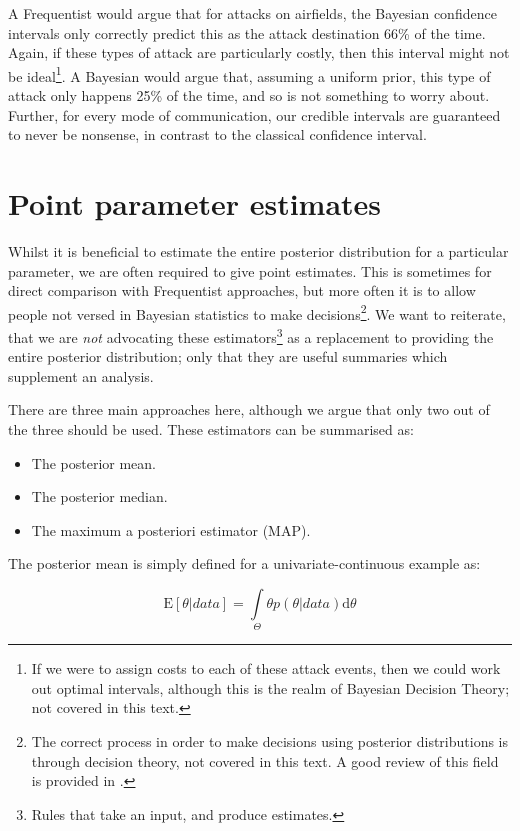 \documentclass[11pt,fullpage]{book}
\begin{document}
A Frequentist would argue that for attacks on airfields, the Bayesian confidence intervals only correctly predict this as the attack destination 66\% of the time. Again, if these types of attack are particularly costly, then this interval might not be ideal\footnote{If we were to assign costs to each of these attack events, then we could work out optimal intervals, although this is the realm of Bayesian Decision Theory; not covered in this text.}. A Bayesian would argue that, assuming a uniform prior, this type of attack only happens 25\% of the time, and so is not something to worry about. Further, for every mode of communication, our credible intervals are guaranteed to never be nonsense, in contrast to the classical confidence interval.

\section{Point parameter estimates}
Whilst it is beneficial to estimate the entire posterior distribution for a particular parameter, we are often required to give point estimates. This is sometimes for direct comparison with Frequentist approaches, but more often it is to allow people not versed in Bayesian statistics to make decisions\footnote{The correct process in order to make decisions using posterior distributions is through decision theory, not covered in this text. A good review of this field is provided in \cite{robert2007bayesian}.}. We want to reiterate, that we are \textit{not} advocating these estimators\footnote{Rules that take an input, and produce estimates.} as a replacement to providing the entire posterior distribution; only that they are useful summaries which supplement an analysis.

There are three main approaches here, although we argue that only two out of the three should be used. These estimators can be summarised as:

\begin{itemize}
\item The posterior mean.
\item The posterior median.
\item The maximum a posteriori estimator (MAP).
\end{itemize}

The posterior mean is simply defined for a univariate-continuous example as:

\begin{equation}
\mathrm{E}[\theta|data] = \int\limits_{\Theta} \theta p(\theta|data)\mathrm{d}\theta
\end{equation}
\end{document}
